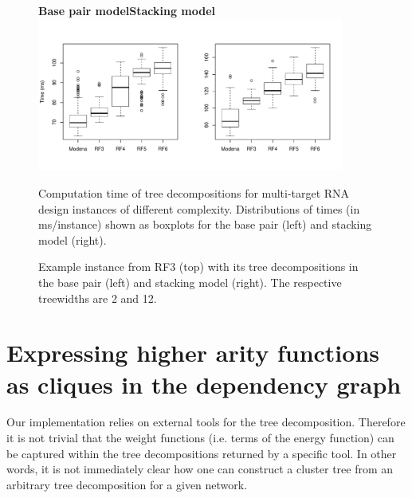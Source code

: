 \documentclass{bioinfo}
\makeatletter
\newlength{\@aligneps}
\newcommand{\includegraphicstop}[2][]{%
\sbox{\@alignepsbox}{\texttt{[image: \#2]}}%
\setlength{\@aligneps}{-\ht\@alignepsbox}%
\addtolength{\@aligneps}{2ex}%
\raisebox{\@aligneps}{\usebox{\@alignepsbox}}}
\makeatother
\begin{document}
\begin{figure}
  \hspace*{2cm}\textbf{Base pair model}\hspace{4.75cm}\textbf{Stacking model}\\[-28pt]
  \centering
  \includegraphics[width=0.9\textwidth]{Figs/td-times}
  \vspace*{-24pt}
  \caption{Computation time of tree decompositions for
    multi-target RNA design instances of different complexity.
    Distributions of times (in ms/instance) shown as boxplots for the base pair (left) and stacking model (right).}
  \label{fig:td-times}
\end{figure}


\begin{figure}[t!]
  \centering
  
  \includegraphicstop[width=0.6\textwidth]{Figs/td-example-basepair}%
  \includegraphicstop[width=0.35\textwidth]{Figs/td-example-stacking}
  \caption{Example instance from RF3 (top) with its tree decompositions in the base pair (left) and stacking model (right). The respective treewidths are 2 and 12.}
  \label{fig:td-example}
\end{figure}

\section{Expressing higher arity functions as cliques in the dependency graph}
\label{appsec:dependency-cliques}

Our implementation relies on external tools for the tree decomposition. Therefore it is not trivial that the weight functions (i.e. terms of the energy function) can be captured within the tree decompositions returned by a specific tool. In other words, it is not immediately clear how one can construct a cluster tree from an arbitrary tree decomposition for a given network. 
\end{document}
